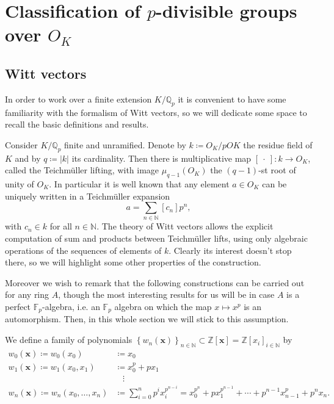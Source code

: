 \section{Classification of \texorpdfstring{$p$}{p}-divisible groups
	over \texorpdfstring{$O_{ K }$}{the ring of integers of K}}



\subsection{Witt vectors}
In order to work over a finite extension $K/\mathbb{Q}_p$ it is convenient to
have some familiarity with the formalism of Witt vectors, so we will dedicate some 
space to recall the basic definitions and results.


\begin{rem}[Motivation]
	Consider $K/\mathbb{Q}_p$ finite and unramified.
	Denote by $k \coloneqq O_K/pOK$ the residue field of $K$ and by $q \coloneqq \left| k \right|$
	its cardinality.
	Then there is multiplicative map $[\ \cdot \ ]\colon k \to O_K$,
	called the Teichmüller lifting, with image $\mu_{q-1}(O_K)$
	the $(q-1)$-st root of unity of $O_K$.
	In particular it is well known that any element $a \in O_K$
	can be uniquely written in a Teichmüller expansion
	\begin{equation*}
		a = \sum_{n \in \mathbb{N}} [c_n] p^n
	,\end{equation*}
	with $c_n \in k$ for all $n \in \mathbb{N}$.
	The theory of Witt vectors allows the explicit computation of sum and
	products between Teichmüller lifts, using only
	algebraic operations of the sequences of elements of $k$.
	Clearly its interest doesn't stop there, so we will highlight some 
	other properties of the construction.

	Moreover we wish to remark that the following constructions
	can be carried out for any ring $A$, though the most interesting
	results for us will be in case $A$ is a perfect $\mathbb{F}_p$-algebra,
	i.e. an $\mathbb{F}_p$ algebra on which the map $x \mapsto x^p$
	is an automorphism.
	Then, in this whole section we will stick to this assumption.
\end{rem}


\begin{defn}
	We define a family of polynomials $\left\{ w_n(\mathbf{x}) \right\}_{n \in \mathbb{N}} \subset
	\mathbb{Z}[\mathbf{x}] = \mathbb{Z}[x_i]_{i \in \mathbb{N}}$ by
	\begin{align*}
		w_0(\mathbf{x}) \coloneqq w_0(x_0) &\coloneqq x_0 \\
		w_1(\mathbf{x}) \coloneqq w_1(x_0, x_1) &\coloneqq x_0^p + px_1 \\
				&\ \ \ \ \! \vdots \\
		w_n(\mathbf{x}) \coloneqq w_n(x_0, \ldots, x_n) &\coloneqq
		\sum_{ i=0 }^{ n } p^i x_i^{p^{n-i}} =
		x_0^{p^n} + px_1^{p^{n-1}} + \cdots + p^{n-1}x_{n-1}^p + p^n x_n
	.\end{align*}
\end{defn}


